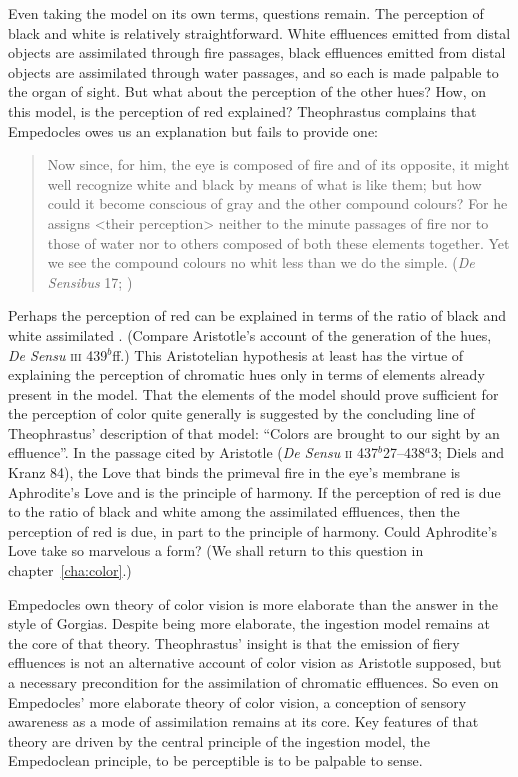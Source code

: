 Even taking the model on its own terms, questions remain. The perception of black and white is relatively straightforward. White effluences emitted from distal objects are assimilated through fire passages, black effluences emitted from distal objects are assimilated through water passages, and so each is made palpable to the organ of sight. But what about the perception of the other hues? How, on this model, is the perception of red explained? Theophrastus complains that Empedocles owes us an explanation but fails to provide one:
\begin{quote}
	Now since, for him, the eye is composed of fire and of its opposite, it might well recognize white and black by means of what is like them; but how could it become conscious of gray and the other compound colours? For he assigns <their perception> neither to the minute passages of fire nor to those of water nor to others composed of both these elements together. Yet we see the compound colours no whit less than we do the simple. (\emph{De Sensibus} 17; \citealt{Stratton:1917vn})
\end{quote}
Perhaps the perception of red can be explained in terms of the ratio of black and white assimilated \citep{Ierodiakonou:2005fk}. (Compare Aristotle's account of the generation of the hues, \emph{De Sensu} \textsc{iii} 439\( ^{b} \)ff.) This Aristotelian hypothesis at least has the virtue of explaining the perception of chromatic hues only in terms of elements already present in the model. That the elements of the model should prove sufficient for the perception of color quite generally is suggested by the concluding line of Theophrastus' description of that model: ``Colors are brought to our sight by an effluence''. In the passage cited by Aristotle (\emph{De Sensu} \textsc{ii} 437\( ^{b} \)27--438\( ^{a} \)3; Diels and Kranz 84), the Love that binds the primeval fire in the eye's membrane is Aphrodite's Love and is the principle of harmony. If the perception of red is due to the ratio of black and white among the assimilated effluences, then the perception of red is due, in part to the principle of harmony. Could Aphrodite's Love take so marvelous a form? (We shall return to this question in chapter~\ref{cha:color}.)

Empedocles own theory of color vision is more elaborate than the answer in the style of Gorgias. Despite being more elaborate, the ingestion model remains at the core of that theory. Theophrastus' insight is that the emission of fiery effluences is not an alternative account of color vision as Aristotle supposed, but a necessary precondition for the assimilation of chromatic effluences. So even on Empedocles' more elaborate theory of color vision, a conception of sensory awareness as a mode of assimilation remains at its core. Key features of that theory are driven by the central principle of the ingestion model, the Empedoclean principle, to be perceptible is to be palpable to sense.

